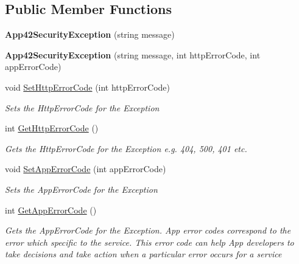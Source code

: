 \subsection*{Public Member Functions}
\begin{DoxyCompactItemize}
\item 
\hypertarget{classcom_1_1shephertz_1_1app42_1_1paas_1_1sdk_1_1windows_1_1_app42_security_exception_a012337f95fa7398cfbb1918f67c171ab}{{\bfseries App42\+Security\+Exception} (string message)}\label{classcom_1_1shephertz_1_1app42_1_1paas_1_1sdk_1_1windows_1_1_app42_security_exception_a012337f95fa7398cfbb1918f67c171ab}

\item 
\hypertarget{classcom_1_1shephertz_1_1app42_1_1paas_1_1sdk_1_1windows_1_1_app42_security_exception_a6a5ce49e1c61418eeb7145f5d25a1146}{{\bfseries App42\+Security\+Exception} (string message, int http\+Error\+Code, int app\+Error\+Code)}\label{classcom_1_1shephertz_1_1app42_1_1paas_1_1sdk_1_1windows_1_1_app42_security_exception_a6a5ce49e1c61418eeb7145f5d25a1146}

\item 
void \hyperlink{classcom_1_1shephertz_1_1app42_1_1paas_1_1sdk_1_1windows_1_1_app42_security_exception_aa49f9c59781e3948cdf44e38946f0dec}{Set\+Http\+Error\+Code} (int http\+Error\+Code)
\begin{DoxyCompactList}\small\item\em Sets the Http\+Error\+Code for the Exception \end{DoxyCompactList}\item 
int \hyperlink{classcom_1_1shephertz_1_1app42_1_1paas_1_1sdk_1_1windows_1_1_app42_security_exception_a26407048a2965f2b2a6a670568fc4ca4}{Get\+Http\+Error\+Code} ()
\begin{DoxyCompactList}\small\item\em Gets the Http\+Error\+Code for the Exception e.\+g. 404, 500, 401 etc. \end{DoxyCompactList}\item 
void \hyperlink{classcom_1_1shephertz_1_1app42_1_1paas_1_1sdk_1_1windows_1_1_app42_security_exception_a4e9bbf24cec11095f815197c5c04b090}{Set\+App\+Error\+Code} (int app\+Error\+Code)
\begin{DoxyCompactList}\small\item\em Sets the App\+Error\+Code for the Exception \end{DoxyCompactList}\item 
int \hyperlink{classcom_1_1shephertz_1_1app42_1_1paas_1_1sdk_1_1windows_1_1_app42_security_exception_acaca611feb5e658d9c4e74cfe3181e48}{Get\+App\+Error\+Code} ()
\begin{DoxyCompactList}\small\item\em Gets the App\+Error\+Code for the Exception. App error codes correspond to the error which specific to the service. This error code can help App developers to take decisions and take action when a particular error occurs for a service \end{DoxyCompactList}\end{DoxyCompactItemize}


